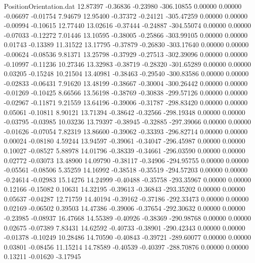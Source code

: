 \begin{filecontents}{PositionOrientation.dat}
  12.87397   -0.36836   -0.23980  -306.10855    0.00000    0.00000   -0.06697   -0.01754    7.94679
  12.95400   -0.37372   -0.24121  -305.47259    0.00000    0.00000   -0.00994   -0.10615   12.77440
  13.02616   -0.37444   -0.24887  -304.55074    0.00000    0.00000   -0.07033   -0.12272    7.01446
  13.10595   -0.38005   -0.25866  -303.99105    0.00000    0.00000    0.01743   -0.13389   11.31522
  13.17795   -0.37879   -0.26830  -303.17640    0.00000    0.00000   -0.00624   -0.08536    9.81371
  13.25798   -0.37929   -0.27513  -302.39096    0.00000    0.00000   -0.10997   -0.11236   10.27346
  13.32983   -0.38719   -0.28320  -301.65289    0.00000    0.00000    0.03205   -0.15248   10.21504
  13.40981   -0.38463   -0.29540  -300.83586    0.00000    0.00000   -0.02833   -0.06431    7.91620
  13.48199   -0.38667   -0.30004  -300.26442    0.00000    0.00000   -0.01269   -0.10425    8.66566
  13.56198   -0.38769   -0.30838  -299.57126    0.00000    0.00000   -0.02967   -0.11871    9.21559
  13.64196   -0.39006   -0.31787  -298.83420    0.00000    0.00000    0.05061   -0.10811    8.90121
  13.71394   -0.38642   -0.32566  -298.19348    0.00000    0.00000   -0.03795   -0.03985   10.03236
  13.79397   -0.38945   -0.32885  -297.39066    0.00000    0.00000   -0.01626   -0.07054    7.82319
  13.86600   -0.39062   -0.33393  -296.82714    0.00000    0.00000    0.00024   -0.08180    4.59244
  13.94597   -0.39061   -0.34047  -296.45987    0.00000    0.00000    0.10027   -0.08527    5.88978
  14.01796   -0.38339   -0.34661  -296.03590    0.00000    0.00000    0.02772   -0.03073   13.48900
  14.09790   -0.38117   -0.34906  -294.95755    0.00000    0.00000   -0.05561   -0.08506    5.35259
  14.16992   -0.38518   -0.35519  -294.57203    0.00000    0.00000   -0.24614   -0.02983   15.14276
  14.24999   -0.40488   -0.35758  -293.35967    0.00000    0.00000    0.12166   -0.15082    0.10631
  14.32195   -0.39613   -0.36843  -293.35202    0.00000    0.00000    0.05637   -0.04287   12.71759
  14.40194   -0.39162   -0.37186  -292.33473    0.00000    0.00000    0.02169   -0.06502    0.39503
  14.47386   -0.39006   -0.37654  -292.30632    0.00000    0.00000   -0.23985   -0.08937   16.47668
  14.55389   -0.40926   -0.38369  -290.98768    0.00000    0.00000    0.02675   -0.07389    7.83431
  14.62592   -0.40733   -0.38901  -290.42343    0.00000    0.00000   -0.01378   -0.10249   10.28486
  14.70590   -0.40843   -0.39721  -289.60077    0.00000    0.00000    0.03801   -0.08456   11.15214
  14.78589   -0.40539   -0.40397  -288.70876    0.00000    0.00000    0.13211   -0.01620   -3.17945

\end{filecontents}
